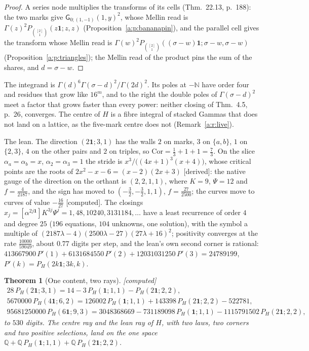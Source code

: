 \documentclass[11pt]{article}
\newcommand{\one}{\mathbf 1}
\newcommand{\sG}{\mathsf G}
\theoremstyle{plain}
\newtheorem{theorem}[proposition]{Theorem}
\theoremstyle{definition}
\theoremstyle{remark}
\newcommand{\derived}{\textup{[derived]}}
\newcommand{\computed}{\textup{[computed]}}
\begin{document}
\begin{proof}
A series node multiplies the transforms of its cells (Thm.~22.13, p.~188): the two marks give $\sG_{0;(1,-1)}(1,y)^2$, whose Mellin read is $\Gamma(z)^2P_{\binom{[2]}1}(z\one;z,z)$ (Proposition~\ref{a:p:bananapin}), and the parallel cell gives the transform whose Mellin read is $\Gamma(w)^2P_{\binom{[2]}1}((\sigma-w)\one;\sigma-w,\sigma-w)$ (Proposition~\ref{a:p:triangles}); the Mellin read of the product pins the sum of the shares, and $d=\sigma-w$.
\end{proof}

The integrand is $\Gamma(d)^6\Gamma(\sigma-d)^2/\Gamma(2d)^2$. Its poles at $-\mathbb N$ have order four and residues that grow like $16^m$, and to the right the double poles of $\Gamma(\sigma-d)^2$ meet a factor that grows faster than every power: neither closing of Thm.~4.5, p.~26, converges. The centre of $H$ is a fibre integral of stacked Gammas that does not land on a lattice, as the five-mark centre does not (Remark~\ref{a:r:live}).

\noindent The lean. The direction $(2\one;3,1)$ has the walls $2$ on marks, $3$ on $\{a,b\}$, $1$ on $\{2,3\}$, $4$ on the other pairs and $2$ on triples, so $\mathrm{Cor}=\frac13+1+1=\frac73$. On the slice $\alpha_a=\alpha_b=x$, $\alpha_2=\alpha_3=1$ the stride is $x^3/\big((4x+1)^3(x+4)\big)$, whose critical points are the roots of $2x^2-x-6=(x-2)(2x+3)$ \derived: the native gauge of the direction on the orthant is $(2,2,1,1)$, where $K=9$, $\Psi=12$ and $f=\frac4{2187}$, and the sign has moved to $(-\frac32,-\frac32,1,1)$, $f=\frac{27}{2500}$; the curves move to curves of value $-\frac{16}{27}$ \computed. The closings $x_j=[\alpha^{2j\one}]K^{3j}\Psi^j=1,48,10240,3131184,\dots$ have a least recurrence of order $4$ and degree $25$ ($196$ equations, $104$ unknowns, one solution), with the symbol a multiple of $(2187\lambda-4)(2500\lambda-27)(27\lambda+16)^2$; positivity converges at the rate $\frac{10000}{59049}$, about $0.77$ digits per step, and the lean's own second corner is rational: $413667900\,P'(1)+6131684550\,P'(2)+12031031250\,P'(3)=24789199$, $P'(k)=P_H(2k\one;3k,k)$.

\begin{theorem}[One content, two rays]\label{a:t:Hcontent}\computed\
\begin{gather*}
28\,P_H(2\one;3,1)=14-3\,P_H(\one;1,1)-P_H(2\one;2,2),\\
5670000\,P_H(4\one;6,2)=126002\,P_H(\one;1,1)+143398\,P_H(2\one;2,2)-522781,\\
95681250000\,P_H(6\one;9,3)=3048368669-731189098\,P_H(\one;1,1)-1115791502\,P_H(2\one;2,2),
\end{gather*}
to $530$ digits. The centre ray and the lean ray of $H$, with two laws, two corners and two positive selections, land on the one space $\mathbb Q+\mathbb Q\,P_H(\one;1,1)+\mathbb Q\,P_H(2\one;2,2)$.
\end{theorem}
\end{document}
